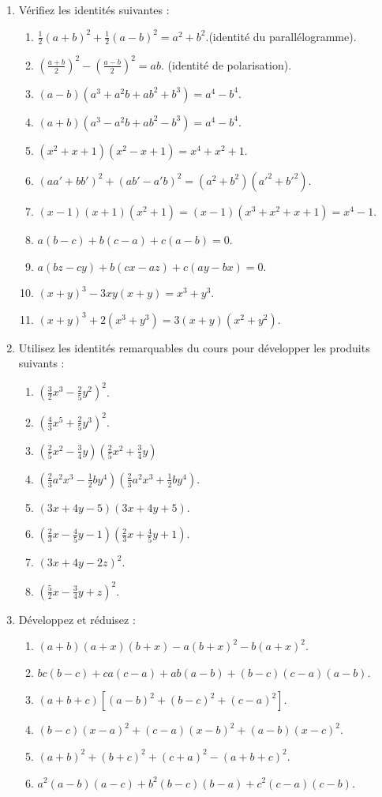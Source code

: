 \documentclass[12 pt]{extarticle}
\theoremstyle{plain}
\begin{document}
\begin{enumerate}
\item Vérifiez les identités suivantes : 
\begin{enumerate}
\item $\frac12(a+b)^2+\frac12(a-b)^2=a^2+b^2$.(identité du parallélogramme).
\item $\left(\frac{a+b}2\right)^2-\left(\frac{a-b}2\right)^2=ab$. (identité de polarisation). 
\item $(a-b)(a^3+a^2b+ab^2+b^3)=a^4-b^4$.
\item $(a+b)(a^3-a^2b+ab^2-b^3)=a^4-b^4$.
\item $(x^2+x+1)(x^2-x+1)= x^4+x^2+1$.
\item $(aa'+bb')^2+(ab'-a'b)^2=(a^2+b^2)(a'^2+b'^2)$.
\item $(x-1)(x+1)(x^2+1)=(x-1)(x^3+x^2+x+1)=x^4-1$.
\item $a(b-c)+b(c-a)+c(a-b)=0$.
\item $a(bz-cy)+b(cx-az)+c(ay-bx)=0$.
\item $(x+y)^3-3xy(x+y)=x^3+y^3$.
\item $(x+y)^3+2(x^3+y^3)=3(x+y)(x^2+y^2)$. 
\end{enumerate}
\item Utilisez les identités remarquables du cours pour développer les produits suivants : 
\begin{enumerate}
\item $\left(\frac32x^3-\frac25y^2\right)^2$.
\item $\left(\frac43x^5+\frac25y^3\right)^2$.
\item $\left(\frac25x^2-\frac34y\right)\left(\frac25x^2+\frac34y\right)$
\item $\left(\frac23a^2x^3-\frac12by^4\right)\left(\frac23a^2x^3+\frac12by^4\right)$.
\item $(3x+4y-5)(3x+4y+5)$.
\item $\left(\frac23x-\frac45y-1\right)\left(\frac23x+\frac45y+1\right)$.
\item $(3x+4y-2z)^2$. 
\item $\left(\frac52x-\frac34y+z\right)^2$. 
\end{enumerate}
\item Développez et réduisez : 
\begin{enumerate}
\item $(a+b)(a+x)(b+x)-a(b+x)^2-b(a+x)^2$.
\item $bc(b-c)+ca(c-a)+ab(a-b)+(b-c)(c-a)(a-b)$.
\item $(a+b+c)[(a-b)^2+(b-c)^2+(c-a)^2]$.
\item $(b-c)(x-a)^2+(c-a)(x-b)^2+(a-b)(x-c)^2$.
\item $(a+b)^2+(b+c)^2+(c+a)^2-(a+b+c)^2$. 
\item $a^2(a-b)(a-c)+b^2(b-c)(b-a)+c^2(c-a)(c-b)$. 
\end{enumerate}
\end{enumerate}
\end{document}
